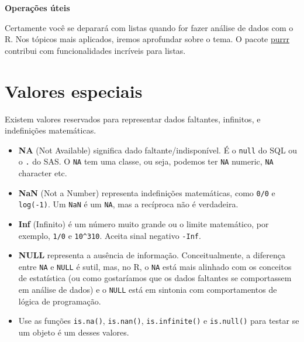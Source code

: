 \documentclass[]{book}
\newenvironment{Shaded}{\begin{snugshade}}{\end{snugshade}}
\newcommand{\CommentTok}[1]{\textcolor[rgb]{0.56,0.35,0.01}{\textit{#1}}}
\newcommand{\DecValTok}[1]{\textcolor[rgb]{0.00,0.00,0.81}{#1}}
\newcommand{\NormalTok}[1]{#1}
\newcommand{\OperatorTok}[1]{\textcolor[rgb]{0.81,0.36,0.00}{\textbf{#1}}}
\newcommand{\StringTok}[1]{\textcolor[rgb]{0.31,0.60,0.02}{#1}}
\providecommand{\tightlist}{%
  \setlength{\itemsep}{0pt}\setlength{\parskip}{0pt}}
\begin{document}
\textbf{Operações úteis}

\begin{Shaded}
\end{Shaded}

Certamente você se deparará com listas quando for fazer análise de dados com o R. Nos tópicos mais aplicados, iremos aprofundar sobre o tema. O pacote \href{https://github.com/hadley/purrr}{purrr} contribui com funcionalidades incríveis para listas.

\hypertarget{valores-especiais}{%
\section{Valores especiais}\label{valores-especiais}}

Existem valores reservados para representar dados faltantes, infinitos, e indefinições matemáticas.

\begin{itemize}
\tightlist
\item
  \textbf{NA} (Not Available) significa dado faltante/indisponível. É o \texttt{null} do SQL ou o \texttt{.} do SAS. O \texttt{NA} tem uma classe, ou seja, podemos ter \texttt{NA} numeric, \texttt{NA} character etc.
\item
  \textbf{NaN} (Not a Number) representa indefinições matemáticas, como \texttt{0/0} e \texttt{log(-1)}. Um \texttt{NaN} é um \texttt{NA}, mas a recíproca não é verdadeira.
\item
  \textbf{Inf} (Infinito) é um número muito grande ou o limite matemático, por exemplo, \texttt{1/0} e \texttt{10\^{}310}. Aceita sinal negativo \texttt{-Inf}.
\item
  \textbf{NULL} representa a ausência de informação. Conceitualmente, a diferença entre \texttt{NA} e \texttt{NULL} é sutil, mas, no R, o \texttt{NA} está mais alinhado com os conceitos de estatística (ou como gostaríamos que os dados faltantes se comportassem em análise de dados) e o \texttt{NULL} está em sintonia com comportamentos de lógica de programação.
\item
  Use as funções \texttt{is.na()}, \texttt{is.nan()}, \texttt{is.infinite()} e \texttt{is.null()} para testar se um objeto é um desses valores.
\end{itemize}
\end{document}
